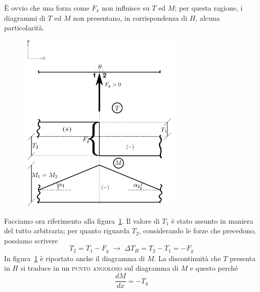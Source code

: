 \noindent È ovvio che una forza come $F_{x}$ non influisce su $T$ ed $M$; per questa ragione, i diagrammi di $T$ ed $M$ non presentano, in corrispondenza di $H$, alcuna particolarità. 
\renewcommand{\thefigure}{13~-~2}
\begin{figure}[ht]
\centering
\includegraphics[width=0.7\textwidth]{Immagini/Parte_13/Figura13_2/figura13_2.pdf}
\caption{}
\label{figura13-2}
\end{figure}
Facciamo ora riferimento alla figura~\ref{figura13-2}. Il valore di $T_1$ è stato assunto in maniera del tutto arbitraria; per quanto riguarda $T_2$, considerando le forze che precedono, possiamo scrivere
\begin{equation*}
T_{2} = T_{1} - F_{y} \,\, \longrightarrow \,\, \Delta T_{H} = T_{2} - T_{1} = - F_{y}
\end{equation*}
In figura~\ref{figura13-2} è riportato anche il diagramma di $M$. La discontinuità che $T$ presenta in $H$ si traduce in un \textsc{punto angoloso} sul diagramma di $M$ e questo perché 
\begin{equation*}
\boxed{\frac{dM}{dx} = - T_{y}}
\end{equation*}
